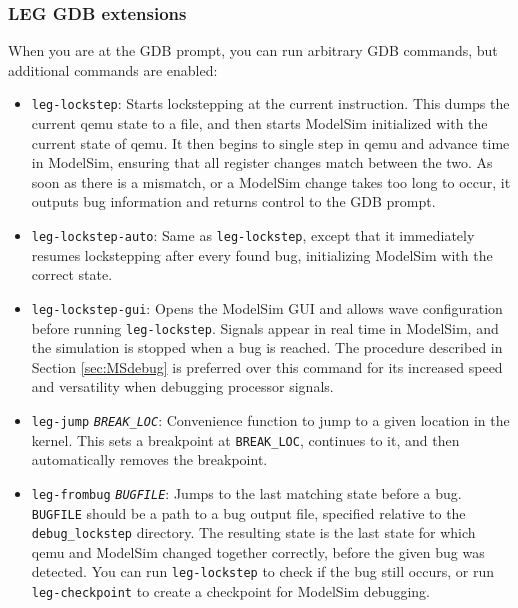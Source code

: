 \subsubsection{LEG GDB extensions}\label{sec:leggdb}

When you are at the GDB prompt, you can run arbitrary GDB commands, but additional commands are enabled:

\begin{itemize}
\item \texttt{leg-lockstep}: Starts lockstepping at the current instruction. This dumps the current qemu state to a file, and then starts ModelSim initialized with the current state of qemu. It then begins to single step in qemu and advance time in ModelSim, ensuring that all register changes match between the two. As soon as there is a mismatch, or a ModelSim change takes too long to occur, it outputs bug information and returns control to the GDB prompt.

\item \texttt{leg-lockstep-auto}: Same as \texttt{leg-lockstep}, except that it immediately resumes lockstepping after every found bug, initializing ModelSim with the correct state.

\item \texttt{leg-lockstep-gui}: Opens the ModelSim GUI and allows wave configuration before running \texttt{leg-lockstep}.
Signals appear in real time in ModelSim, and the simulation is stopped when a bug is reached. 
The procedure described in Section \ref{sec:MSdebug} is preferred over this command for its increased speed and versatility when debugging processor signals.

\item \texttt{leg-jump} \texttt{\emph{BREAK\_LOC}}: Convenience function to jump to a given location in the kernel. This sets a breakpoint at \texttt{BREAK\_LOC}, continues to it, and then automatically removes the breakpoint.

\item \texttt{leg-frombug} \texttt{\emph{BUGFILE}}: Jumps to the last matching state before a bug. \texttt{BUGFILE} should be a path to a bug output file, specified relative to the \texttt{debug\_lockstep} directory. The resulting state is the last state for which qemu and ModelSim changed together correctly, before the given bug was detected. You can run \texttt{leg-lockstep} to check if the bug still occurs, or run \texttt{leg-checkpoint} to create a checkpoint for ModelSim debugging.


\end{itemize}
